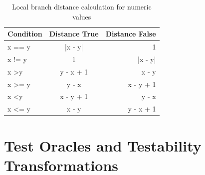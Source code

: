 \documentclass[paper=a4,%
  twoside,%
  BCOR4mm,%
  abstract=true,%
  toc=bibliography,%
  chapterprefix=true,%
  toc=bibliographynumbered,%
  open=right,%
  english,%
  pagesize=pdftex]{scrreprt}
\begin{document}

\begin{table}[]
\centering
\begin{tabular}{lcr}
\hline
\textbf{Condition}  & \textbf{Distance True} & \textbf{Distance False} \\
\hline
x == y              & |x - y|                & 1                       \\
x != y              & 1                      & |x - y|                 \\
x \textgreater y    & y - x + 1              & x - y                   \\
x \textgreater{}= y & y - x                  & x - y + 1               \\
x \textless y       & x - y + 1              & y - x                   \\
x \textless{}= y    & x - y                  & y - x + 1               \\ \hline
\end{tabular}
\caption{Local branch distance calculation for numeric values}
\label{tab:local-branch-distance-formulas}
\end{table}

\section{Test Oracles and Testability Transformations}
\label{sec:testability-transformations}
\end{document}
